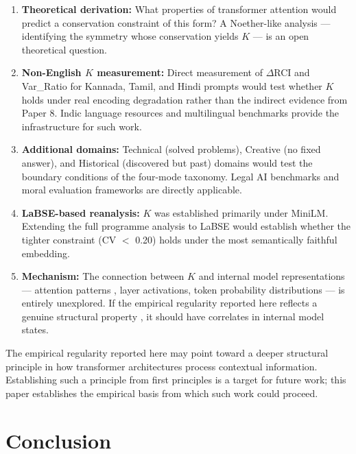 \documentclass[11pt,a4paper]{article}
\begin{document}
\begin{enumerate}
    \item \textbf{Theoretical derivation:} What properties of transformer attention
    \citep{vaswani2017} would predict a conservation constraint of this form? A Noether-like
    analysis --- identifying the symmetry whose conservation yields $K$ --- is an
    open theoretical question.
    \item \textbf{Non-English $K$ measurement:} Direct measurement of $\Delta$RCI and
    Var\_Ratio for Kannada, Tamil, and Hindi prompts would test whether $K$ holds
    under real encoding degradation rather than the indirect evidence from Paper 8.
    Indic language resources \citep{gala2023indictrans2} and multilingual benchmarks
    \citep{ahuja2023,lai2023chatgpt} provide the infrastructure for such work.
    \item \textbf{Additional domains:} Technical (solved problems), Creative (no fixed
    answer), and Historical (discovered but past) domains would test the boundary
    conditions of the four-mode taxonomy. Legal AI benchmarks \citep{guha2023} and
    moral evaluation frameworks \citep{ji2024moralbench} are directly applicable.
    \item \textbf{LaBSE-based reanalysis:} $K$ was established primarily under MiniLM.
    Extending the full programme analysis to LaBSE \citep{enevoldsen2025mmteb} would
    establish whether the tighter constraint (CV $<$ 0.20) holds under the most
    semantically faithful embedding.
    \item \textbf{Mechanism:} The connection between $K$ and internal model representations
    --- attention patterns \citep{olsson2022induction}, layer activations, token probability
    distributions --- is entirely unexplored. If the empirical regularity reported here
    reflects a genuine structural property \citep{wei2022emergent}, it should have
    correlates in internal model states.
\end{enumerate}

The empirical regularity reported here may point toward a deeper structural principle
in how transformer architectures process contextual information. Establishing such a
principle from first principles is a target for future work; this paper establishes
the empirical basis from which such work could proceed.

\section{Conclusion}
\end{document}
